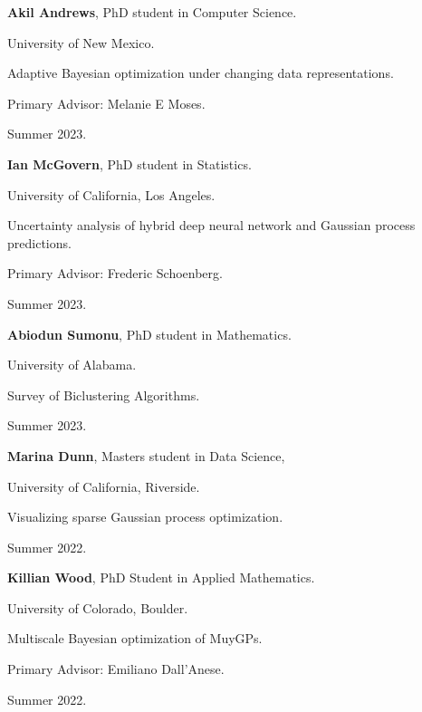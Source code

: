 \begin{innerlist}
  \item[] \textbf{Akil Andrews},
  PhD student in Computer Science.
  \begin{innerlist}
    \item[-] University of New Mexico.
    \item[-] Adaptive Bayesian optimization under changing data representations.
    \item[-] Primary Advisor: Melanie E Moses.
    \item[-] Summer 2023.
  \end{innerlist}

  \item[] \textbf{Ian McGovern},
  PhD student in Statistics.
  \begin{innerlist}
    \item[-] University of California, Los Angeles.
    \item[-] Uncertainty analysis of hybrid deep neural network and Gaussian process predictions.
    \item[-] Primary Advisor: Frederic Schoenberg.
    \item[-] Summer 2023.
  \end{innerlist}

  \item[] \textbf{Abiodun Sumonu},
  PhD student in Mathematics.
  \begin{innerlist}
    \item[-] University of Alabama.
    \item[-] Survey of Biclustering Algorithms.
    \item[-] Summer 2023.
  \end{innerlist}

  \item[] \textbf{Marina Dunn},
  Masters student in Data Science,
  \begin{innerlist}
    \item[-] University of California, Riverside.
    \item[-] Visualizing sparse Gaussian process optimization.
    \item[-] Summer 2022.
  \end{innerlist}

  \item[] \textbf{Killian Wood},
  PhD Student in Applied Mathematics.
  \begin{innerlist}
    \item[-] University of Colorado, Boulder.
    \item[-] Multiscale Bayesian optimization of MuyGPs.
    \item[-] Primary Advisor: Emiliano Dall'Anese.
    \item[-] Summer 2022.
  \end{innerlist}


\end{innerlist}
